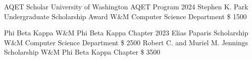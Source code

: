 
\begin{cvhonors}
\cvhonor
{AQET Scholar}
{University of Washington AQET Program}
{}
{2024}
\cvhonor
{Stephen K. Park Undergraduate Scholarship Award}
{W\&M Computer Science Department}
{\$ 1500}
{}

\end{cvhonors}
\begin{cvhonors}
\cvhonor
{Phi Beta Kappa}
{W\&M Phi Beta Kappa Chapter}
{}
{2023}
\cvhonor
{Elias Paparis Scholarship}
{W\&M Computer Science Department}
{\$ 2500}
{}
\cvhonor
{Robert C. and Muriel M. Jennings Scholarship}
{W\&M Phi Beta Kappa Chapter}
{\$ 3500}
{}

\end{cvhonors}
